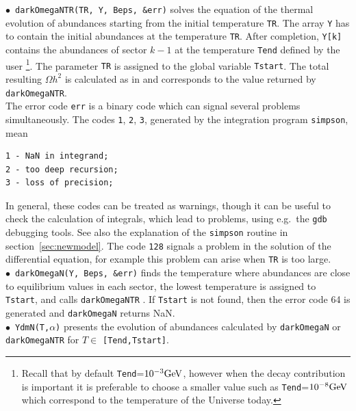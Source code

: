 \documentclass[12pt,a4paper]{article}
\begin{document}
 \noindent
$\bullet$~\verb|darkOmegaNTR(TR, Y, Beps, &err)|  solves the equation of the thermal evolution of abundances
starting from the initial temperature {\tt TR}. The array {\tt Y} has to contain the initial abundances at the temperature
{\tt TR}. After completion, {\tt Y[k]} contains the abundances of sector $k-1$ at the temperature {\tt Tend} defined by the
user \footnote{Recall that by default {\tt Tend}=$10^{-3} {\rm GeV}$, however when the decay contribution is important it is preferable to choose a smaller value such as {\tt Tend}=$10^{-8} {\rm GeV}$ which correspond to the temperature of the Universe today.}. The parameter {\tt TR} is assigned to the global variable {\tt Tstart}. The total resulting $\Omega h^2$
is calculated as in \cite{Alguero:coscattering} and corresponds to the value returned by  \verb|darkOmegaNTR|. \\
%
The error code {\tt err} is a binary code which can signal several problems simultaneously. 
The codes {\tt 1}, {\tt 2}, {\tt 3}, generated by the integration program {\tt simpson}, mean 
\begin{verbatim} 
1 - NaN in integrand;
2 - too deep recursion;
3 - loss of precision;
\end{verbatim}
In general, these codes can be treated as warnings, though it can be useful to 
check the calculation of integrals, which  lead to problems,  using e.g.\ the {\tt gdb} debugging tools. 
See also the explanation of the {\tt simpson} routine in section~\ref{sec:newmodel}. 
The code {\tt 128} signals a problem in the solution of the differential equation, for example this problem 
 can arise when {\tt TR} is too large. 
\\
$\bullet$~\verb|darkOmegaN(Y, Beps, &err)|  
finds the  temperature where abundances are
close to equilibrium values in each sector, the lowest temperature is assigned to {\tt Tstart}, and calls  {\tt darkOmegaNTR} . If {\tt Tstart} is not found, then the 
error code 64 is generated and {\tt darkOmegaN} returns NaN. 
\\
$\bullet$~\verb|YdmN(T,|$\alpha${\tt)}  presents  the evolution of abundances calculated by
\verb|darkOmegaN| or \verb|darkOmegaNTR|  for  $ T \in $ {\tt [Tend,Tstart]}.\\
\end{document}
